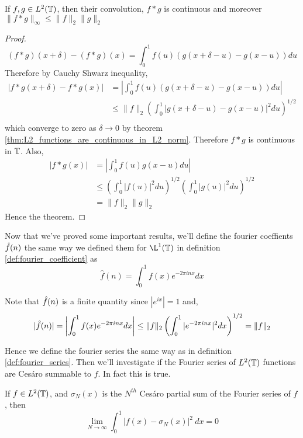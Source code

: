 \begin{theorem}
  \label{thm:convolution_of_L2_functions}
  If $f, g \in L^2(\mathbb T)$, then their convolution, $f*g$ is continuous and moreover $\|f*g\|_{\infty} \le \|f\|_2 \|g\|_2$
\end{theorem}
\begin{proof}
  $$(f*g)(x+\delta) - (f*g)(x) = \int_0^1 f(u)(g(x+\delta - u) - g(x-u)) du $$
  Therefore by Cauchy Shwarz inequality, 
  \begin{align*}
    |f*g(x+\delta) - f*g(x)| &= \left| \int_0^1 f(u) (g(x + \delta -u)- g(x-u)) du \right| \\
          &\le \|f\|_2 \left( \int_0^1|g(x+\delta - u) - g(x-u)|^2 du \right)^{1/2} \\
  \end{align*}
  which converge to zero as $\delta \to 0$ by theorem \ref{thm:L2_functions_are_continuous_in_L2_norm}. Therefore $f*g$ is continuous in $\mathbb T$.
  Also, 
  \begin{align*}
    |f*g(x)| &= \left| \int_0^1 f(u)g(x-u) du \right| \\
            &\le \left(\int_0^1 |f(u)|^2 du \right)^{1/2} \left(\int_0^1 |g(u)|^2 du \right)^{1/2} \\
            &= \|f\|_2 \|g\|_2
  \end{align*}
  Hence the theorem.
\end{proof}

 Now that we've proved some important results, we'll define the fourier coeffients $\hat{f}(n)$ the same way we defined them for $\L^1(\T)$ in definition \ref{def:fourier_coefficient} as 
$$\hat{f}(n) = \int_0^1 f(x)e^{-2\pi inx} dx$$

Note that $\hat{f}(n)$ is a finite quantity since $|e^{ix}| = 1$ and,
$$ |\hat{f}(n)| = \left| \int_0^1 f(x)e^{-2\pi inx} dx \right| \le \|f\|_2\left(\int_0^1 |e^{-2\pi inx}|^2 dx\right)^{1/2} = \|f\|_2 $$

Hence we define the fourier series the same way as in definition \ref{def:fourier_series}. Then we'll investigate if the Fourier series of $L^2(\mathbb T)$ functions are Ces\'aro summable to $f$. In fact this is true.

\begin{theorem}
  If $f\in L^2(\mathbb T)$, and $\sigma_N(x)$ is the $N^{th}$ Ces\'aro partial sum of the Fourier series of $f$, then
  $$ \lim_{N \to \infty} \int_0^1 |f(x) - \sigma_N(x)|^2 \ dx = 0$$
\end{theorem}

